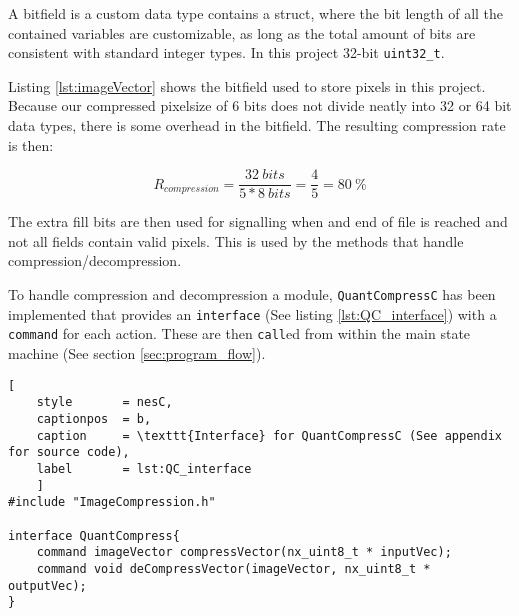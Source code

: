 A bitfield is a custom data type contains a struct, where the bit length of all the contained variables are customizable, as long as the total amount of bits are consistent with standard integer types.
In this project 32-bit \texttt{uint32\_t}.

Listing \ref{lst:imageVector} shows the bitfield used to store pixels in this project.
Because our compressed pixelsize of 6 bits does not divide neatly into 32 or 64 bit data types, there is some overhead in the bitfield.
The resulting compression rate is then:

\begin{equation}
R_{compression} = 
\dfrac{32\ bits}
{5 * 8\ bits} =
\dfrac{4}{5} = 
80\ \%
\end{equation}

The extra fill bits are then used for signalling when and end of file is reached and not all fields contain valid pixels.
This is used by the methods that handle compression/decompression. 

To handle compression and decompression a module, \texttt{QuantCompressC} has been implemented that provides an \texttt{interface} (See listing \ref{lst:QC_interface}) with a \texttt{command} for each action.
These are then \texttt{call}ed from within the main state machine (See section \ref{sec:program_flow}).

\begin{lstlisting}[
	style		= nesC, 
	captionpos	= b, 
	caption		= \texttt{Interface} for QuantCompressC (See appendix for source code),
	label		= lst:QC_interface
	]
#include "ImageCompression.h"

interface QuantCompress{
	command imageVector compressVector(nx_uint8_t * inputVec);
	command void deCompressVector(imageVector, nx_uint8_t * outputVec);
}
\end{lstlisting}
